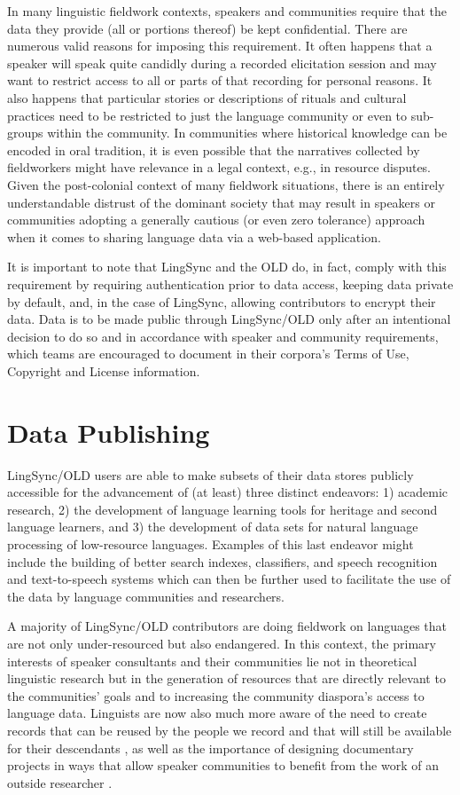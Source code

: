 \documentclass[11pt]{article}
\begin{document}
In many linguistic fieldwork contexts, speakers and communities require that
the data they provide (all or portions thereof) be kept confidential.
There are numerous valid reasons for imposing this requirement. It often happens
that a speaker will speak quite candidly during a recorded elicitation session and
may want to restrict access to all or parts of that recording for personal
reasons. It also happens that particular stories or descriptions of rituals and
cultural practices need to be restricted to just the language community or
even to sub-groups within the community. In communities where historical knowledge 
can be encoded in oral tradition, it is even possible that the narratives collected 
by fieldworkers might have relevance in a legal context, e.g., in resource disputes.
Given the post-colonial context of many fieldwork situations, there is an entirely
understandable distrust of the dominant society that may result in speakers or
communities adopting a generally cautious (or even zero tolerance) approach when
it comes to sharing language data via a web-based application.

It is important to note that LingSync and the OLD do, in fact, comply with this
requirement by requiring authentication prior to data access, keeping data
private by default, and, in the case of LingSync, allowing contributors to
encrypt their data. Data is to be made public through LingSync/OLD only after
an intentional decision to do so and in accordance with speaker and community
requirements, which teams are encouraged to document in their corpora's Terms of
Use, Copyright and License information.


\section{Data Publishing}
\label{open-data}

LingSync/OLD users are able to make subsets of their data stores publicly
accessible for the advancement of (at least) three distinct endeavors: 1)
academic research, 2) the development of language learning tools for
heritage and second language learners, and 3) the development of data sets for
natural language processing of low-resource languages. Examples of this last
endeavor might include the building of better search indexes, classifiers,
and speech recognition and text-to-speech systems which can then be further
used to facilitate the use of the data by language communities and researchers.

A majority of LingSync/OLD contributors are doing fieldwork on languages that
are not only under-resourced but also endangered. In this context, the primary
interests of speaker consultants and their communities lie not in theoretical
linguistic research but in the generation of resources that are directly
relevant to the communities' goals and to increasing the community diaspora's
access to language data. Linguists are now also much more aware of the need to
create records that can be reused by the people we record and that will still be
available for their descendants \cite[p.129]{Thieberger:2012}, as well as the
importance of designing documentary projects in ways that allow speaker
communities to benefit from the work of an outside researcher \cite{Good:2012}.
\end{document}
